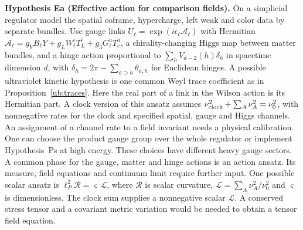 \documentclass[aps,pra,onecolumn,superscriptaddress,nofootinbib,10pt]{revtex4-2}
\theoremstyle{definition}
\theoremstyle{remark}
\begin{document}
\smallskip\noindent\textbf{Hypothesis Ea (Effective action for comparison fields).}\label{hyp:Ea}  On a simplicial regulator model the spatial coframe, hypercharge, left
weak and color data by separate bundles. Use gauge links
$U_\ell=\exp(i\epsilon_\ell \mathcal A_\ell)$ with Hermitian
$\mathcal A_\ell=g_YB_\ell Y+g_LW_\ell^i T_L^i+g_3G_\ell^aT_c^a$,
a chirality-changing Higgs map between matter bundles, and a hinge
action proportional to $\sum_h V_{d-2}(h)\delta_h$ in spacetime dimension
$d$, with $\delta_h=2\pi-\sum_{\sigma\supset h}\theta_{\sigma,h}$ for
Euclidean hinges. A possible ultraviolet kinetic hypothesis is one common
Weyl trace coefficient as in Proposition~\ref{ub:traces}. Here the real part of a link in the Wilson action is its Hermitian part.
A clock version of this ansatz assumes
$\nu_{\rm clock}^2+\sum_A\nu_A^2=\nu_0^2$, with nonnegative rates
for the clock and specified spatial, gauge and Higgs channels.
An assignment of a channel rate to a field invariant needs a physical
calibration. One can choose the product gauge group over the whole regulator or implement
Hypothesis~Ps at high energy. These choices have different
heavy gauge sectors. A common phase for the gauge, matter and hinge actions
is an action ansatz. Its measure, field equations and continuum limit require further input.
One possible scalar ansatz is $\ell_P^2\mathcal R=\varsigma\,\mathcal L$,
where $\mathcal R$ is scalar curvature,
$\mathcal L=\sum_A\nu_A^2/\nu_0^2$ and $\varsigma$ is dimensionless.
The clock sum supplies a nonnegative scalar $\mathcal L$.
A conserved stress tensor and a covariant metric variation would be
needed to obtain a tensor field equation. \cite{ub:regge,ub:wilson,n7:CC}
\end{document}
